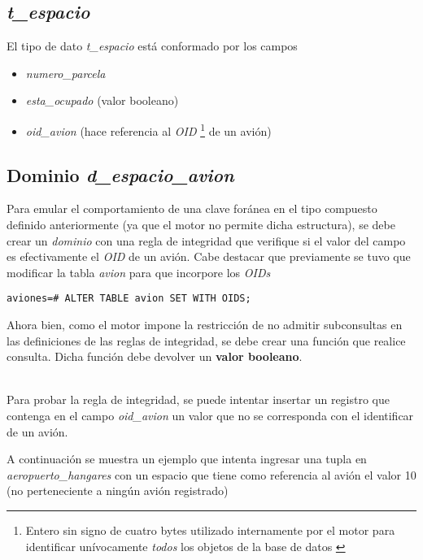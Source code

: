 \subsection{\emph{t\_espacio}}

El tipo de dato \emph{t\_espacio} está conformado por los campos
\begin{itemize}
    \item \emph{numero\_parcela} 
    \item \emph{esta\_ocupado} (valor booleano) 
    \item \emph{oid\_avion} (hace referencia al \emph{OID} \footnote{Entero sin signo de cuatro bytes utilizado internamente por el motor para identificar unívocamente \emph{todos} los objetos de la base de datos \cite{oid}} de un avión)
\end{itemize}

\subsection{Dominio \emph{d\_espacio\_avion}}

Para emular el comportamiento de una clave foránea en el tipo compuesto definido anteriormente (ya que el motor no permite dicha estructura), se debe crear un \emph{dominio} con una regla de integridad que verifique si el valor del campo es efectivamente el \emph{OID} de un avión. Cabe destacar que previamente se tuvo que modificar la tabla \emph{avion} para que incorpore los \emph{OIDs}  

\vspace*{5mm}
\lstset{style=sql}
\begin{lstlisting}
aviones=# ALTER TABLE avion SET WITH OIDS;
\end{lstlisting}

Ahora bien, como el motor impone la restricción de no admitir subconsultas en las definiciones de las reglas de integridad, se debe crear una función que realice consulta. Dicha función debe devolver un \textbf{valor booleano}. 

~\\

Para probar la regla de integridad, se puede intentar insertar un registro que contenga en el campo \emph{oid\_avion} un valor que no se corresponda con el identificar de un avión. 

A continuación se muestra un ejemplo que intenta ingresar una tupla en \emph{aeropuerto\_hangares} con un espacio que tiene como referencia al avión el valor 10 (no perteneciente a ningún avión registrado)

